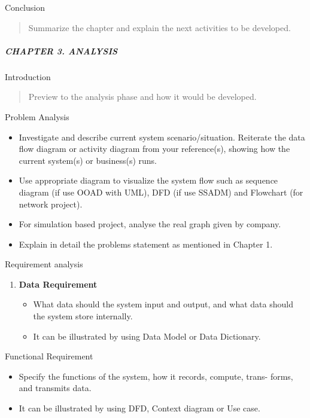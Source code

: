 Conclusion

\begin{quote}
Summarize the chapter and explain the next activities to be developed.
\end{quote}

\subparagraph{CHAPTER 3. ANALYSIS}\label{chapter-3.-analysis}

Introduction

\begin{quote}
Preview to the analysis phase and how it would be developed.
\end{quote}

Problem Analysis

\begin{itemize}
\item
  Investigate and describe current system scenario/situation. Reiterate
  the data flow diagram or activity diagram from your reference(s),
  showing how the current system(s) or business(s) runs.
\item
  Use appropriate diagram to visualize the system flow such as sequence
  diagram (if use OOAD with UML), DFD (if use SSADM) and Flowchart (for
  network project).
\item
  For simulation based project, analyse the real graph given by company.
\item
  Explain in detail the problems statement as mentioned in Chapter 1.
\end{itemize}

Requirement analysis

\begin{enumerate}
\def\labelenumi{\arabic{enumi}.}
\item
  \textbf{Data Requirement}

  \begin{itemize}
  \item
    What data should the system input and output, and what data should
    the system store internally.
  \item
    It can be illustrated by using Data Model or Data Dictionary.
  \end{itemize}
\end{enumerate}

Functional Requirement

\begin{itemize}
\item
  Specify the functions of the system, how it records, compute, trans-
  forms, and transmits data.
\item
  It can be illustrated by using DFD, Context diagram or Use case.
\end{itemize}

